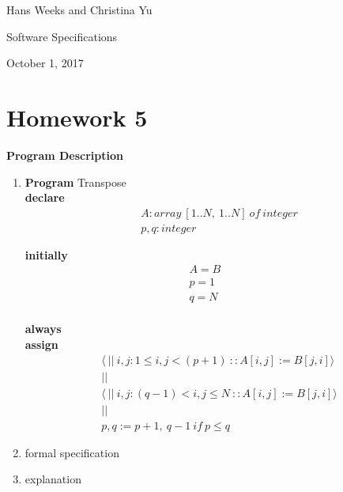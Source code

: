\documentclass{article}
\begin{document}
\hfill Hans Weeks and Christina Yu

\hfill Software Specifications

\hfill October 1, 2017
\section*{Homework 5}
\textbf{Program Description}\\

\begin{enumerate}
\item
\textbf{Program} Transpose\\
\textbf{declare}\\

\begin{align*}
&A: array \ [1..N,\ 1..N]\ of \ integer\\
&p, q: integer
\end{align*}

\textbf{initially}\\

\begin{align*}
A=B\quad&\\
p=1\quad&\\
q=N\quad&\\
\end{align*}


\textbf{always}\\
\textbf{assign}\\

\begin{align*}
&\langle \ || \ i,j : 1\leq i,j< (p+1) \ :: A[i,j]:=B[j,i] \rangle \\
&||\\
&\langle \ || \ i,j : (q-1) < i,j \leq N \ :: A[i,j]:=B[j,i] \rangle \\
&||\\
&p,q := p+1,\ q-1\ if\ p \leq q
\end{align*}

\item formal specification
\item explanation
\end{enumerate}
\end{document}
